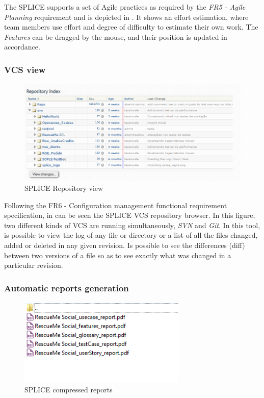 The \ac{SPLICE} supports a set of Agile practices as required by the \textit{FR5 - Agile Planning} requirement and is depicted in . It shows an effort estimation, where team  members  use effort and degree of difficulty to estimate their own work. The \textit{Features} can be dragged by the mouse, and their position is updated in accordance. 



\subsubsection{\acf{VCS} view}
\begin{figure}[htp]
\begin{center}
  \includegraphics[width=16cm]{chapters/proposed_solution/img/captures/splice-gitandsvn.PNG}
  \caption[SPLICE VCS view]{SPLICE Repository view}
  \label{fg:splice-vcsview}
\end{center}
\end{figure}

Following the {FR6 - Configuration management} functional requirement specification, in  can be seen the \ac{SPLICE} \ac{VCS} repository browser. In this figure, two different kinds of \ac{VCS} are running simultaneously,  \textit{SVN} and \textit{Git}.
In this tool, is possible to  view the log of any file or directory or a list of all the files changed, added or deleted in any given revision. Is possible to see the differences (diff) between two versions of a file so as to see exactly what was changed in a particular revision.


\subsubsection{Automatic reports generation}

\begin{figure}[htp]
\begin{center}
  \includegraphics[width=8cm]{chapters/proposed_solution/img/captures/zipped.PNG}
  \caption[SPLICE compressed reports]{SPLICE compressed reports }
  \label{fg:splice-zipped}
\end{center}
\end{figure}


